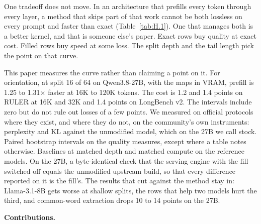\documentclass[11pt]{article}
\begin{document}
One tradeoff does not move. In an architecture that prefills every token through every layer, a method that skips part of that work cannot be both lossless on every prompt and faster than exact (Table~\ref{tab:H.1}). One that manages both is a better kernel, and that is someone else's paper. Exact rows buy quality at exact cost. Filled rows buy speed at some loss. The split depth and the tail length pick the point on that curve.

This paper measures the curve rather than claiming a point on it. For orientation, at split 16 of 64 on Qwen3.8-27B, with the maps in VRAM, prefill is 1.25 to 1.31$\times$ faster at 16K to 120K tokens. The cost is 1.2 and 1.4 points on RULER at 16K and 32K and 1.4 points on LongBench v2. The intervals include zero but do not rule out losses of a few points. We measured on official protocols where they exist, and where they do not, on the community's own instruments: perplexity and KL against the unmodified model, which on the 27B we call stock. Paired bootstrap intervals on the quality measures, except where a table notes otherwise. Baselines at matched depth and matched compute on the reference models. On the 27B, a byte-identical check that the serving engine with the fill switched off equals the unmodified upstream build, so that every difference reported on it is the fill's. The results that cut against the method stay in: Llama-3.1-8B gets worse at shallow splits, the rows that help two models hurt the third, and common-word extraction drops 10 to 14 points on the 27B.

\noindent \textbf{Contributions.}\par\nopagebreak
\end{document}
